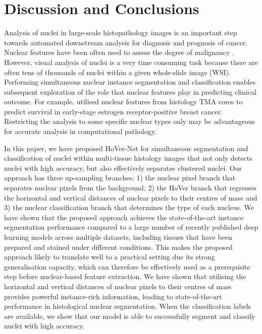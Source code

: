 \documentclass[journal]{IEEEtran}
\begin{document}
	\section{Discussion and Conclusions} \label{section:discussion}
	Analysis of nuclei in large-scale histopathology images is an important step towards automated downstream analysis for diagnosis and prognosis of cancer. Nuclear features have been often used to assess the degree of malignancy \cite{gurcan2009histopathological}. However, visual analysis of nuclei is a very time consuming task because there are often tens of thousands of nuclei within a given whole-slide image (WSI). Performing simultaneous nuclear instance segmentation and classification enables subsequent exploration of the role that nuclear features play in predicting clinical outcome. For example, \cite{lu2018nuclear} utilised nuclear features from histology TMA cores to predict survival in early-stage estrogen receptor-positive breast cancer.
Restricting the analysis to some specific nuclear types only may be advantageous for accurate analysis in computational pathology.


	
	In this paper, we have proposed HoVer-Net for simultaneous segmentation and classification of nuclei within multi-tissue histology images that not only detects nuclei with high accuracy, but also effectively separates clustered nuclei. Our approach has three up-sampling branches: 1) the nuclear pixel branch that separates nuclear pixels from the background; 2) the HoVer branch that regresses the horizontal and vertical distances of nuclear pixels to their centres of mass and 3) the nuclear classification branch that determines the type of each nucleus. We have shown that the proposed approach achieves the state-of-the-art instance segmentation performance compared to a large number of recently published deep learning models across multiple datasets, including tissues that have been prepared and stained under different conditions. This makes the proposed approach likely to translate well to a practical setting due its strong generalisation capacity, which can therefore be effectively used as a prerequisite step before nuclear-based feature extraction. We have shown that utilising the horizontal and vertical distances of nuclear pixels to their centres of mass provides powerful instance-rich information, leading to state-of-the-art performance in histological nuclear segmentation. When the classification labels are available, we show that our model is able to successfully segment and classify nuclei with high accuracy. 
	
\end{document}
